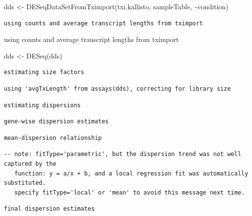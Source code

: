\documentclass[
  letterpaper,
  DIV=11,
  numbers=noendperiod]{scrartcl}
\newenvironment{Shaded}{\begin{snugshade}}{\end{snugshade}}
\newcommand{\FunctionTok}[1]{\textcolor[rgb]{0.28,0.35,0.67}{#1}}
\newcommand{\NormalTok}[1]{\textcolor[rgb]{0.00,0.23,0.31}{#1}}
\newcommand{\OtherTok}[1]{\textcolor[rgb]{0.00,0.23,0.31}{#1}}
\newcommand{\SpecialCharTok}[1]{\textcolor[rgb]{0.37,0.37,0.37}{#1}}
\begin{document}
\begin{Shaded}
\begin{Highlighting}[]
\NormalTok{dds }\OtherTok{\textless{}{-}} \FunctionTok{DESeqDataSetFromTximport}\NormalTok{(txi.kallisto,}
\NormalTok{                                sampleTable, }
                                \SpecialCharTok{\textasciitilde{}}\NormalTok{condition)}
\end{Highlighting}
\end{Shaded}

\begin{verbatim}
using counts and average transcript lengths from tximport
\end{verbatim}

using counts and average transcript lengths from tximport

\begin{Shaded}
\begin{Highlighting}[]
\NormalTok{dds }\OtherTok{\textless{}{-}} \FunctionTok{DESeq}\NormalTok{(dds)}
\end{Highlighting}
\end{Shaded}

\begin{verbatim}
estimating size factors
\end{verbatim}

\begin{verbatim}
using 'avgTxLength' from assays(dds), correcting for library size
\end{verbatim}

\begin{verbatim}
estimating dispersions
\end{verbatim}

\begin{verbatim}
gene-wise dispersion estimates
\end{verbatim}

\begin{verbatim}
mean-dispersion relationship
\end{verbatim}

\begin{verbatim}
-- note: fitType='parametric', but the dispersion trend was not well captured by the
   function: y = a/x + b, and a local regression fit was automatically substituted.
   specify fitType='local' or 'mean' to avoid this message next time.
\end{verbatim}

\begin{verbatim}
final dispersion estimates
\end{verbatim}
\end{document}
